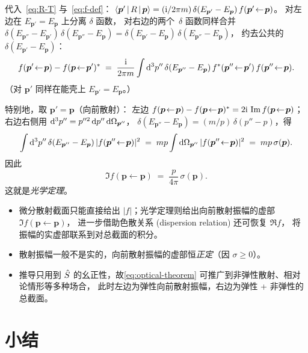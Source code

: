 代入~\eqref{eq:R-T} 与~\eqref{eq:f-def}：
$\left\langle \bm{p}' \,\middle|\, R \,\middle|\, \bm{p} \right\rangle = (\mathrm{i}/2\pi m)\,\delta(E_{\bm{p}'}-E_{\bm{p}})\,f(\bm{p}'\!\leftarrow\!\bm{p})$。
对左边在 $E_{\bm{p}'} = E_{\bm{p}}$ 上分离 $\delta$ 函数，
对右边的两个~$\delta$ 函数同样合并 $\delta(E_{\bm{p}''}-E_{\bm{p}'})\,\delta(E_{\bm{p}''}-E_{\bm{p}}) =
\delta(E_{\bm{p}'}-E_{\bm{p}})\,\delta(E_{\bm{p}''}-E_{\bm{p}})$，
约去公共的 $\delta(E_{\bm{p}'}-E_{\bm{p}})$：
\begin{equation}
f(\bm{p}'\!\leftarrow\!\bm{p}) - f(\bm{p}\!\leftarrow\!\bm{p}')^*
\;=\; \frac{\rmi}{2\pi m}\int \rmd^3 p''\,\delta(E_{\bm{p}''}-E_{\bm{p}})\,
f^*(\bm{p}''\!\leftarrow\!\bm{p}')\,f(\bm{p}''\!\leftarrow\!\bm{p}).
\label{eq:opt-thm-general}
\end{equation}
（对 $\bm{p}'$ 同样在能壳上 $E_{\bm{p}'} = E_{\bm{p}}$。）

特别地，取 $\bm{p}' = \bm{p}$（向前散射）：
左边 $f(\bm{p}\!\leftarrow\!\bm{p}) - f(\bm{p}\!\leftarrow\!\bm{p})^* = 2\mathrm{i}\,\Im f(\bm{p}\!\leftarrow\!\bm{p})$；
右边右侧用 $\mathrm{d}^3 p'' = p''^2\,\mathrm{d} p''\,\mathrm{d}\Omega_{\bm{p}''}$，
$\delta(E_{\bm{p}''}-E_{\bm{p}}) = (m/p)\,\delta(p''-p)$，得
\begin{equation}
\int \mathrm{d}^3 p''\,\delta(E_{\bm{p}''}-E_{\bm{p}})\,|f(\bm{p}''\!\leftarrow\!\bm{p})|^2
\;=\; m p \int \mathrm{d}\Omega_{\bm{p}''}\,|f(\bm{p}''\!\leftarrow\!\bm{p})|^2 \;=\; m p \,\sigma(\bm{p}).
\end{equation}
因此
\begin{equation}
\boxed{\;\Im f(\bm{p}\!\leftarrow\!\bm{p}) \;=\; \frac{p}{4\pi}\,\sigma(\bm{p}).\;}
\label{eq:optical-theorem}
\end{equation}
这就是\emph{光学定理}。

\begin{remark}
\begin{itemize}
\item 微分散射截面只能直接给出 $|f|$；光学定理则给出向前散射振幅的虚部 $\Im f(\bm{p}\!\leftarrow\!\bm{p})$，
进一步借助色散关系 (dispersion relation) 还可恢复 $\Re f$，
将振幅的实虚部联系到对总截面的积分。
\item 散射振幅一般不是实的，向前散射振幅的虚部恒\emph{正定}（因 $\sigma\geq 0$）。
\item 推导只用到 $\hat{S}$ 的幺正性，故\eqref{eq:optical-theorem} 可推广到非弹性散射、相对论情形等多种场合，
此时左边为弹性向前散射振幅，右边为弹性 + 非弹性的总截面。
\end{itemize}
\end{remark}

\section{小结}

